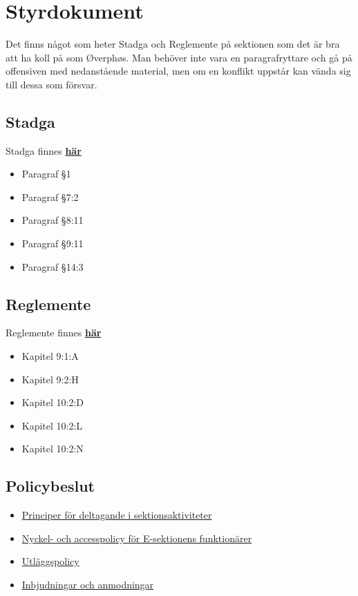\documentclass[10pt]{article}
\begin{document}
    \section{Styrdokument}
    Det finns något som heter Stadga och Reglemente på sektionen som det är bra att ha koll på som Øverphøs. Man behöver inte vara en paragrafryttare och gå på offensiven med nedanstående material, men om en konflikt uppstår kan vända sig till dessa som försvar.

    \subsection{Stadga}
    Stadga finnes \href{https://eee.esek.se/files/styrdokument/stadga.pdf}{\textbf{här}}
    \begin{itemize}
        \item [] Paragraf §1
        \item [] Paragraf §7:2
        \item [] Paragraf §8:11
        \item [] Paragraf §9:11
        \item [] Paragraf §14:3
    \end{itemize}

    \subsection{Reglemente}
    Reglemente finnes \href{https://eee.esek.se/files/styrdokument/reglemente.pdf}{\textbf{här}}
    \begin{itemize}
        \item [] Kapitel 9:1:A
        \item [] Kapitel 9:2:H
        \item [] Kapitel 10:2:D
        \item [] Kapitel 10:2:L
        \item [] Kapitel 10:2:N
    \end{itemize}

    \subsection{Policybeslut}
    \begin{itemize}
        \item [] \href{https://eee.esek.se/files/styrdokument/policies/sektionsaktiviteter.pdf}{Principer för deltagande i sektionsaktiviteter}
        \item [] \href{https://eee.esek.se/files/styrdokument/policies/nyckelpolicy.pdf}{Nyckel- och accesspolicy för E-sektionens funktionärer}
        \item [] \href{https://eee.esek.se/files/styrdokument/policies/utlaggspolicy.pdf}{Utläggspolicy}
        \item [] \href{https://eee.esek.se/files/styrdokument/policies/inbjudningar.pdf}{Inbjudningar och anmodningar}
    \end{itemize}
    
\end{document}
